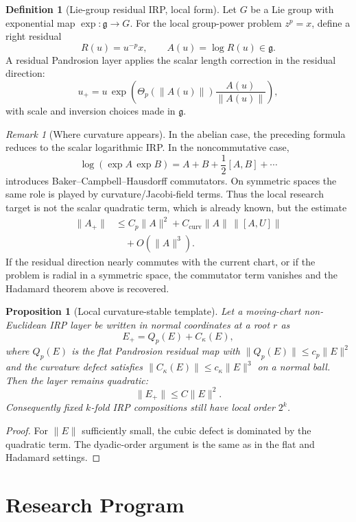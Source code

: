 \documentclass[10pt,a4paper]{article}
\theoremstyle{plain}
\newtheorem{proposition}[theorem]{Proposition}
\theoremstyle{definition}
\newtheorem{definition}[theorem]{Definition}
\theoremstyle{remark}
\newtheorem{remark}[theorem]{Remark}
\begin{document}
\begin{definition}[Lie-group residual IRP, local form]
Let $G$ be a Lie group with exponential map $\exp:\mathfrak g\to G$.  For the
local group-power problem $z^p=x$, define a right residual
\[
  R(u)=u^{-p}x,\qquad A(u)=\log R(u)\in\mathfrak g.
\]
A residual Pandrosion layer applies the scalar length correction in the residual
direction:
\[
  u_+=u\,\exp\!\left(
    \Theta_p(\|A(u)\|)
    \frac{A(u)}{\|A(u)\|}
  \right),
\]
with scale and inversion choices made in $\mathfrak g$.
\end{definition}

\begin{remark}[Where curvature appears]
In the abelian case, the preceding formula reduces to the scalar logarithmic IRP.
In the noncommutative case,
\[
  \log(\exp A\,\exp B)
    =A+B+\frac12[A,B]+\cdots
\]
introduces Baker--Campbell--Hausdorff commutators.  On symmetric spaces the same
role is played by curvature/Jacobi-field terms.  Thus the local research target
is not the scalar quadratic term, which is already known, but the estimate
\[
\begin{aligned}
  \|A_+\|
    &\le C_p\|A\|^2
      +C_{\mathrm{curv}}\|A\|\,\|[A,U]\|  \\
    &\quad +O(\|A\|^3).
\end{aligned}
\]
If the residual direction nearly commutes with the current chart, or if the
problem is radial in a symmetric space, the commutator term vanishes and the
Hadamard theorem above is recovered.
\end{remark}

\begin{proposition}[Local curvature-stable template]
Let a moving-chart non-Euclidean IRP layer be written in normal coordinates at a
root $r$ as
\[
  E_+=Q_p(E)+C_\kappa(E),
\]
where $Q_p(E)$ is the flat Pandrosion residual map with
$\|Q_p(E)\|\le c_p\|E\|^2$ and the curvature defect satisfies
$\|C_\kappa(E)\|\le c_\kappa\|E\|^3$ on a normal ball.  Then the layer remains
quadratic:
\[
  \|E_+\|\le C\|E\|^2.
\]
Consequently fixed $k$-fold IRP compositions still have local order $2^k$.
\end{proposition}

\begin{proof}
For $\|E\|$ sufficiently small, the cubic defect is dominated by the quadratic
term.  The dyadic-order argument is the same as in the flat and Hadamard
settings.
\end{proof}

\section{Research Program}
\end{document}
